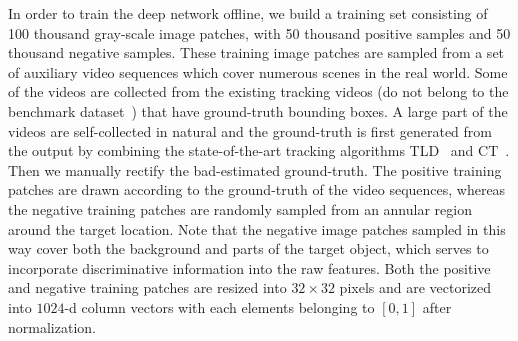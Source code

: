 \documentclass[preprint,12pt,review]{elsarticle}
\begin{document}
In order to train the deep network offline, we build a training set consisting of 100 thousand gray-scale image patches, with 50 thousand positive samples and 50 thousand negative samples.
These training image patches are sampled from a set of auxiliary video sequences which cover numerous scenes in the real world. Some of the videos are collected from the existing tracking videos (do not belong to the benchmark dataset~\cite{wu2013online}) that have ground-truth bounding boxes. A large part of the videos are self-collected in natural and the ground-truth is first generated from the output by combining the state-of-the-art tracking algorithms TLD~\cite{kalal2010pn} and CT~\cite{zhang2012real}. Then we manually rectify the bad-estimated ground-truth. 
The positive training patches are drawn according to the ground-truth of the video sequences, whereas the negative training patches are randomly sampled from an annular region around the target location.
Note that the negative image patches sampled in this way cover both the background and parts of the target object, which serves to incorporate discriminative information into the raw features.
Both the positive and negative training patches are resized into $32 \times 32$ pixels and are vectorized into $1024$-d column vectors with each elements belonging to $[0,1]$ after normalization.
\end{document}
